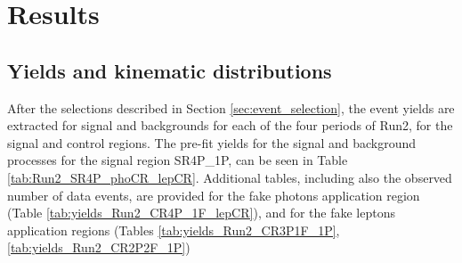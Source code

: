 \chapter{Results}
\section{Yields and kinematic distributions}
After the selections described in Section \ref{sec:event_selection}, the event yields are extracted for signal and backgrounds for each of the four periods of Run2, for the signal and control regions.
The pre-fit yields for the signal and background processes for the signal region SR4P\_1P, can be seen in Table \ref{tab:Run2_SR4P_phoCR_lepCR}.
Additional tables, including also the observed number of data events, are provided for the fake photons application region (Table \ref{tab:yields_Run2_CR4P_1F_lepCR}), and for the fake leptons application regions (Tables \ref{tab:yields_Run2_CR3P1F_1P}, \ref{tab:yields_Run2_CR2P2F_1P})

